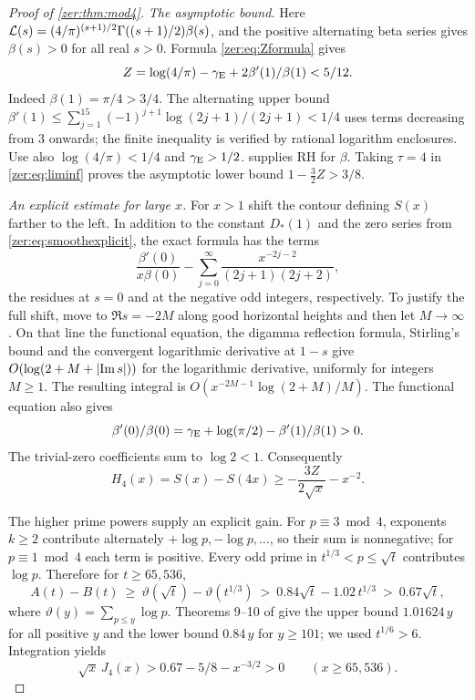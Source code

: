 \begin{proof}[Proof of \cref{zer:thm:mod4}]
\emph{The asymptotic bound.} Here
$\mathcal{L}(s)=(4/\pi)^{(s+1)/2}\Gamma((s+1)/2)\beta(s)$, and the positive alternating beta
series gives $\beta(s)>0$ for all real $s>0$. Formula \eqref{zer:eq:Zformula} gives
\[
 Z=\log(4/\pi)-\gamma_{\mathrm{E}}+2\beta'(1)/\beta(1)<5/12 .
\]
Indeed $\beta(1)=\pi/4>3/4$. The alternating upper bound
$\beta'(1)\le\sum_{j=1}^{15}(-1)^{j+1}\log(2j+1)/(2j+1)<1/4$ uses terms decreasing from $3$
onwards; the finite inequality is verified by rational logarithm enclosures. Use also
$\log(4/\pi)<1/4$ and $\gamma_{\mathrm{E}}>1/2$.  supplies RH for $\beta$. Taking
$\tau=4$ in \eqref{zer:eq:liminf} proves the asymptotic lower bound $1-\tfrac32Z>3/8$.

\emph{An explicit estimate for large $x$.} For $x>1$ shift the contour defining $S(x)$
farther to the left. In addition to the constant $D_*(1)$ and the zero series from
\eqref{zer:eq:smoothexplicit}, the exact formula has the terms
\[
 \frac{\beta'(0)}{x\beta(0)}-\sum_{j=0}^\infty\frac{x^{-2j-2}}{(2j+1)(2j+2)},
\]
the residues at $s=0$ and at the negative odd integers, respectively. To justify the full
shift, move to $\Re s=-2M$ along good horizontal heights and then let $M\to\infty$. On that
line the functional equation, the digamma reflection formula, Stirling's bound and the
convergent logarithmic derivative at $1-s$ give $O(\log(2+M+\lvert\operatorname{Im} s\rvert))$ for the
logarithmic derivative, uniformly for integers $M\ge1$. The resulting integral is
$O(x^{-2M-1}\log(2+M)/M)$. The functional equation also gives
\[
 \beta'(0)/\beta(0)=\gamma_{\mathrm{E}}+\log(\pi/2)-\beta'(1)/\beta(1)>0 .
\]
The trivial-zero coefficients sum to $\log2<1$. Consequently
\[
 H_4(x)=S(x)-S(4x)\ge-\frac{3Z}{2\sqrt x}-x^{-2}.
\]

The higher prime powers supply an explicit gain. For $p\equiv3\bmod4$, exponents $k\ge2$
contribute alternately $+\log p,-\log p,\dots$, so their sum is nonnegative; for
$p\equiv1\bmod4$ each term is positive. Every odd prime in $t^{1/3}<p\le\sqrt t$
contributes $\log p$. Therefore for $t\ge65{,}536$,
\[
 A(t)-B(t)\ \ge\ \vartheta(\sqrt t)-\vartheta(t^{1/3})\ >\ 0.84\sqrt t-1.02\,t^{1/3}
 \ >\ 0.67\sqrt t ,
\]
where $\vartheta(y)=\sum_{p\le y}\log p$. Theorems 9--10 of \cite{RosserSchoenfeld1962Approximate}
give the upper bound $1.01624\,y$ for all positive $y$ and the lower bound $0.84\,y$ for
$y\ge101$; we used $t^{1/6}>6$. Integration yields
\[
 \sqrt x\,J_4(x)>0.67-5/8-x^{-3/2}>0\qquad(x\ge65{,}536).
\]


\end{proof}
